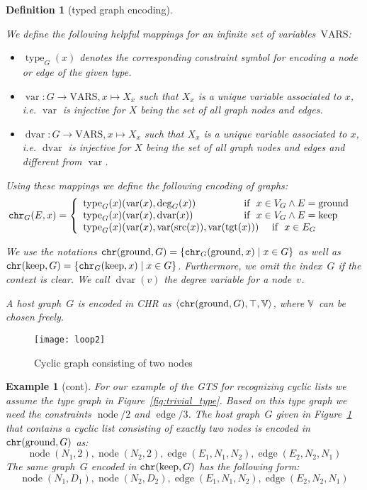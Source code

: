 \documentclass{tlp}
\newtheorem{example}{Example}[section]
\newtheorem{definition}{Definition}[section]
\newcommand{\st}[3]{\ensuremath{\langle #1 , #2 , #3 \rangle}}
\newcommand{\bbV}{\ensuremath{\mathbb{V}}}
\DeclareMathOperator{\var}{var}
\DeclareMathOperator{\dvar}{dvar}
\DeclareMathOperator{\type}{type}
\DeclareMathOperator{\src}{src}
\DeclareMathOperator{\tgt}{tgt}
\DeclareMathOperator{\gnd}{ground}
\DeclareMathOperator{\kp}{keep}
\DeclareMathOperator{\node}{node}
\DeclareMathOperator{\edge}{edge}
\newcommand{\chr}{\ensuremath{{\tt chr}}}
\newcommand{\VARS}{\ensuremath{\mbox{VARS}}}
\begin{document}
\begin{definition}[typed graph encoding]\label{def:encoding}
 
We define the following helpful mappings for an infinite set
of variables~\VARS:

\begin{itemize}
  \item $\type_G(x)$ denotes the corresponding constraint symbol for encoding a
  node or edge of the given type.

  \item $\var : G \rightarrow \VARS, x \mapsto X_x$ such that $X_x$ is a unique
  variable associated to $x$, i.e. $\var$ is injective for $X$ being the set of
  all graph nodes and edges.
  
  \item $\dvar : G \rightarrow \VARS, x \mapsto X_x$ such that $X_x$ is a unique
  variable associated to $x$, i.e. $\dvar$ is injective for $X$ being the set of
  all graph nodes and edges and different from $\var$.
\end{itemize}

Using these mappings we define the following encoding of graphs:
\[
\chr_G(E, x) = \left\{ \begin{array}{lp{3cm}}
	\type_G(x)( \var(x), \deg_G(x)) & \hskip-1cm\text{ if } $x \in V_G \land
	E=\gnd$ \\ \type_G(x)( \var(x), \dvar(x)) & \hskip-1cm\text{ if } $x \in V_G
	\land E =\kp$\\ \type_G(x)( \var(x), \var(\src(x)), \var(\tgt(x))) & \text{ if } $x \in
	E_G$ \end{array}\right.
\]

We use the notations $\chr(\gnd, G) = \{ \chr_G(\gnd, x) \mid x \in G \}$ as
well as $\chr(\kp, G) = \{ \chr_G(\kp, x) \mid x \in G \}$. Furthermore, we omit the
index~$G$ if the context is clear. We call $\dvar(v)$ the \emph{degree variable}
for a node~$v$.

A host graph~$G$ is encoded in CHR as $\st{\chr(\gnd,G)}{\top}{\bbV}$, where
\bbV\ can be chosen freely.
\end{definition}

\begin{figure}
\texttt{[image: loop2]}
\caption{Cyclic graph consisting of two nodes} 
\label{fig:loop2}
\end{figure}

\begin{example}[cont] For our example of the GTS for recognizing cyclic lists we
assume the type graph in Figure~\ref{fig:trivial_type}. Based on this type graph
we need the constraints $\node/2$ and $\edge/3$. The host graph~$G$ given in
Figure~\ref{fig:loop2} that contains a cyclic list consisting of exactly two
nodes is encoded in $\chr(\gnd, G)$ as: \[ \node(N_1, 2),
\node(N_2, 2), \edge(E_1, N_1, N_2), \edge(E_2, N_2, N_1) \] The same
graph~$G$ encoded in $\chr(\kp, G)$ has the following form: \[ \node(N_1, D_1),
\node(N_2, D_2), \edge(E_1, N_1, N_2), \edge(E_2, N_2, N_1) \]
\end{example}
\end{document}
